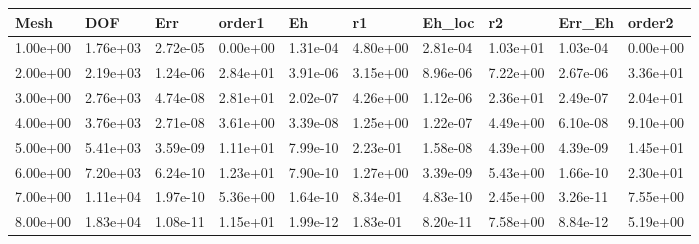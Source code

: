 \begin{tabular}{llllllllll}
Mesh & DOF & Err & order1 & Eh & r1 & Eh_loc & r2 & Err_Eh & order2 \\ 
\hline 
1.00e+00 & 1.76e+03 & 2.72e-05 & 0.00e+00 & 1.31e-04 & 4.80e+00 & 2.81e-04 & 1.03e+01 & 1.03e-04 & 0.00e+00 \\ 
2.00e+00 & 2.19e+03 & 1.24e-06 & 2.84e+01 & 3.91e-06 & 3.15e+00 & 8.96e-06 & 7.22e+00 & 2.67e-06 & 3.36e+01 \\ 
3.00e+00 & 2.76e+03 & 4.74e-08 & 2.81e+01 & 2.02e-07 & 4.26e+00 & 1.12e-06 & 2.36e+01 & 2.49e-07 & 2.04e+01 \\ 
4.00e+00 & 3.76e+03 & 2.71e-08 & 3.61e+00 & 3.39e-08 & 1.25e+00 & 1.22e-07 & 4.49e+00 & 6.10e-08 & 9.10e+00 \\ 
5.00e+00 & 5.41e+03 & 3.59e-09 & 1.11e+01 & 7.99e-10 & 2.23e-01 & 1.58e-08 & 4.39e+00 & 4.39e-09 & 1.45e+01 \\ 
6.00e+00 & 7.20e+03 & 6.24e-10 & 1.23e+01 & 7.90e-10 & 1.27e+00 & 3.39e-09 & 5.43e+00 & 1.66e-10 & 2.30e+01 \\ 
7.00e+00 & 1.11e+04 & 1.97e-10 & 5.36e+00 & 1.64e-10 & 8.34e-01 & 4.83e-10 & 2.45e+00 & 3.26e-11 & 7.55e+00 \\ 
8.00e+00 & 1.83e+04 & 1.08e-11 & 1.15e+01 & 1.99e-12 & 1.83e-01 & 8.20e-11 & 7.58e+00 & 8.84e-12 & 5.19e+00 \\ 
\hline 
\end{tabular}